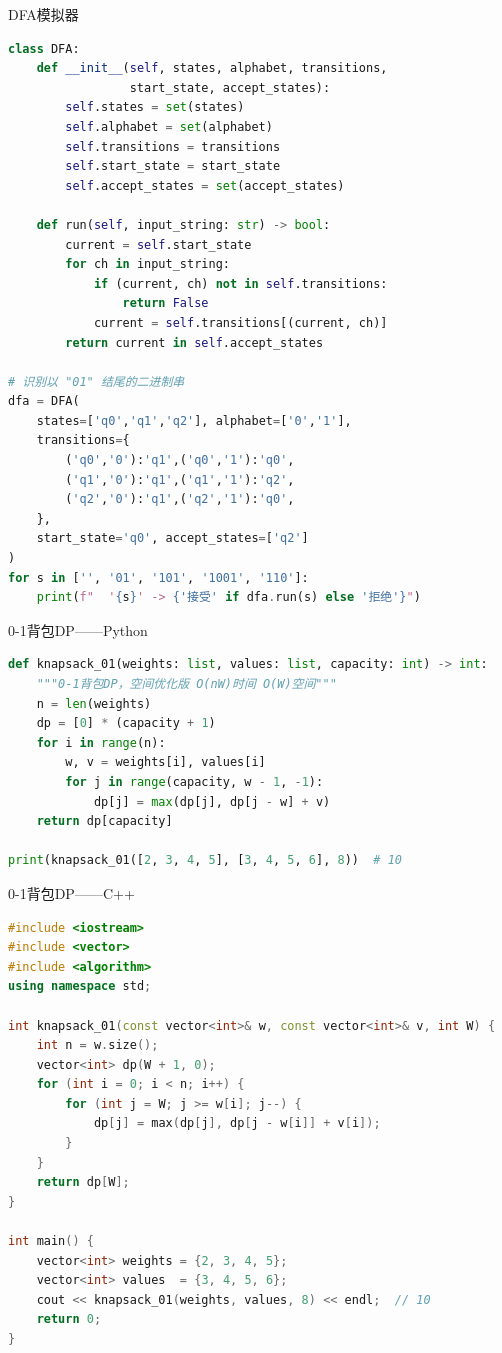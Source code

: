 \begin{mycode}{DFA模拟器}
\begin{lstlisting}[language=Python]
class DFA:
    def __init__(self, states, alphabet, transitions,
                 start_state, accept_states):
        self.states = set(states)
        self.alphabet = set(alphabet)
        self.transitions = transitions
        self.start_state = start_state
        self.accept_states = set(accept_states)

    def run(self, input_string: str) -> bool:
        current = self.start_state
        for ch in input_string:
            if (current, ch) not in self.transitions:
                return False
            current = self.transitions[(current, ch)]
        return current in self.accept_states

# 识别以 "01" 结尾的二进制串
dfa = DFA(
    states=['q0','q1','q2'], alphabet=['0','1'],
    transitions={
        ('q0','0'):'q1',('q0','1'):'q0',
        ('q1','0'):'q1',('q1','1'):'q2',
        ('q2','0'):'q1',('q2','1'):'q0',
    },
    start_state='q0', accept_states=['q2']
)
for s in ['', '01', '101', '1001', '110']:
    print(f"  '{s}' -> {'接受' if dfa.run(s) else '拒绝'}")
\end{lstlisting}
\end{mycode}

\begin{mycode}{0-1背包DP——Python}
\begin{lstlisting}[language=Python]
def knapsack_01(weights: list, values: list, capacity: int) -> int:
    """0-1背包DP，空间优化版 O(nW)时间 O(W)空间"""
    n = len(weights)
    dp = [0] * (capacity + 1)
    for i in range(n):
        w, v = weights[i], values[i]
        for j in range(capacity, w - 1, -1):
            dp[j] = max(dp[j], dp[j - w] + v)
    return dp[capacity]

print(knapsack_01([2, 3, 4, 5], [3, 4, 5, 6], 8))  # 10
\end{lstlisting}
\end{mycode}

\begin{mycode}{0-1背包DP——C++}
\begin{lstlisting}[language=C++]
#include <iostream>
#include <vector>
#include <algorithm>
using namespace std;

int knapsack_01(const vector<int>& w, const vector<int>& v, int W) {
    int n = w.size();
    vector<int> dp(W + 1, 0);
    for (int i = 0; i < n; i++) {
        for (int j = W; j >= w[i]; j--) {
            dp[j] = max(dp[j], dp[j - w[i]] + v[i]);
        }
    }
    return dp[W];
}

int main() {
    vector<int> weights = {2, 3, 4, 5};
    vector<int> values  = {3, 4, 5, 6};
    cout << knapsack_01(weights, values, 8) << endl;  // 10
    return 0;
}
\end{lstlisting}
\end{mycode}

